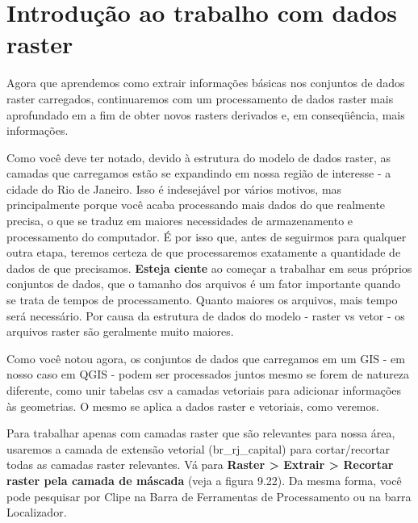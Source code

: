 \documentclass[
]{krantz}
\begin{document}
\hypertarget{introduuxe7uxe3o-ao-trabalho-com-dados-raster}{%
\section{Introdução ao trabalho com dados raster}\label{introduuxe7uxe3o-ao-trabalho-com-dados-raster}}

Agora que aprendemos como extrair informações básicas nos conjuntos de dados raster carregados, continuaremos com um processamento de dados raster mais aprofundado em a fim de obter novos rasters derivados e, em conseqüência, mais informações.

Como você deve ter notado, devido à estrutura do modelo de dados raster, as camadas que carregamos estão se expandindo em nossa região de interesse - a cidade do Rio de Janeiro. Isso é indesejável por vários motivos, mas principalmente porque você acaba processando mais dados do que realmente precisa, o que se traduz em maiores necessidades de armazenamento e processamento do computador. É por isso que, antes de seguirmos para qualquer outra etapa, teremos certeza de que processaremos exatamente a quantidade de dados de que precisamos. \textbf{Esteja ciente} ao começar a trabalhar em seus próprios conjuntos de dados, que o tamanho dos arquivos é um fator importante quando se trata de tempos de processamento. Quanto maiores os arquivos, mais tempo será necessário. Por causa da estrutura de dados do modelo - raster vs vetor - os arquivos raster são geralmente muito maiores.

Como você notou agora, os conjuntos de dados que carregamos em um GIS - em nosso caso em QGIS - podem ser processados \hspace{0pt}\hspace{0pt}juntos mesmo se forem de natureza diferente, como unir tabelas csv a camadas vetoriais para adicionar informações às geometrias. O mesmo se aplica a dados raster e vetoriais, como veremos.

Para trabalhar apenas com camadas raster que são relevantes para nossa área, usaremos a camada de extensão vetorial (br\_rj\_capital) para cortar/recortar todas as camadas raster relevantes. Vá para \textbf{Raster \textgreater{} Extrair \textgreater{} Recortar raster pela camada de máscada} (veja a figura 9.22). Da mesma forma, você pode pesquisar por Clipe na Barra de Ferramentas de Processamento ou na barra Localizador.
\end{document}

